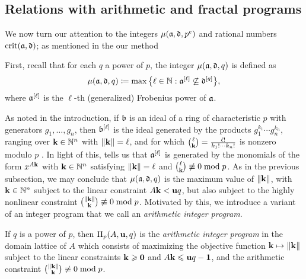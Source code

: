 \documentclass[11pt]{amsart}
\begin{document}
\subsection{Relations with arithmetic and fractal programs}

 We now turn our attention to the integers $\mu(\mathfrak{a}, \mathfrak{d}, p^e)$ and rational numbers $\operatorname{crit}(\mathfrak{a},\mathfrak{d})$; as mentioned in the our method

 First, recall that for each $q$ a power of $p$, the integer $\mu(\mathfrak{a}, \mathfrak{d}, q)$ is defined as 
\[\mu(\mathfrak{a},\mathfrak{d},q) \coloneqq \max\big\{ \ell \in \mathbb{N} : \mathfrak{a}^{[\ell]} \not\subseteq \mathfrak{d}^{[q]}\big\},\]
where $\mathfrak{a}^{[\ell]}$ is the $\ell$-th (generalized) Frobenius power of $\mathfrak{a}$.

As noted in the introduction, if $\mathfrak{b}$ is an ideal of a ring of characteristic $p$ with generators $g_1, \ldots, g_n$, then $\mathfrak{b}^{[\ell]}$ is the ideal generated by the products $g_1^{k_1}\cdots g_n^{k_n}$, ranging over $\mathbf{k} \in \mathbb{N}^n$ with $\| \mathbf{k} \|=\ell$, and for which  $\binom{\ell}{\mathbf{k}} =
\frac{\ell!}{k_1 ! \cdots k_n !}$ is nonzero modulo $p$  \cite[Proposition~3.5]{hernandez+etal.frobenius_powers}.
In light of this,  tells us that $\mathfrak{a}^{[\ell]}$ is generated by the monomials of the form $x^{A \mathbf{k}}$ with $\mathbf{k} \in \mathbb{N}^n$ satisfying $\| \mathbf{k} \|=\ell$ and $\binom{\ell}{\mathbf{k}} \not\equiv 0 \bmod p$.  As in the previous subsection, we may conclude that $\mu(\mathfrak{a},\mathfrak{d},q)$ is the maximum value of $\| \mathbf{k} \|$, with $\mathbf{k} \in \mathbb{N}^n$ subject to the linear constraint $A\mathbf{k} < \mathbf{u}q$, but also subject to the highly nonlinear constraint $\binom{\| \mathbf{k} \|}{\mathbf{k}} \not\equiv 0 \bmod{p}$.  Motivated by this, we introduce a variant of an integer program that we call an \emph{arithmetic integer program}.

\begin{definition}
\label{aip: D}
If $q$ is a power of $p$, then $\Pi_p(A, \mathbf{u}, q)$ is the \emph{arithmetic integer program} in the domain lattice of $A$ which consists of maximizing the objective function $\mathbf{k} \mapsto \| \mathbf{k} \|$ subject to the linear constraints $\mathbf{k} \geqslant \mathbf{0}$ and $A \mathbf{k} \leqslant \mathbf{u}q - \mathbf{1}$, and the arithmetic constraint $\binom{\| \mathbf{k} \|}{\mathbf{k}} \not \equiv 0 \bmod p$.
\end{definition}
\end{document}
